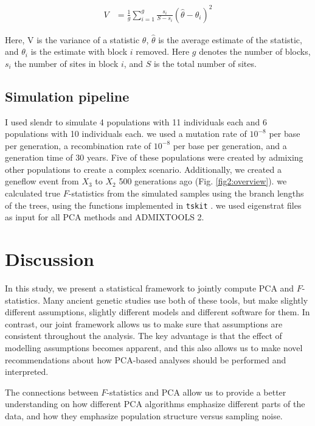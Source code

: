 \documentclass[12pt]{article}
\begin{document}
\begin{align}\label{eq:bjk_var}
V &= \frac{1}{g} \sum_{i=1}^g \frac{s_i}{S-s_i} (\hat{\theta} - \theta_i)^2
\end{align}

Here, V is the variance of a statistic $\theta$, $\hat{\theta}$ is the average estimate of the statistic, and $\theta_i$ is the estimate with block $i$ removed. Here $g$ denotes the number of blocks, $s_i$ the number of sites in block $i$, and $S$ is the total number of sites.

\subsection{Simulation pipeline}

I used slendr \citep{petr_slendr_2022} to simulate 4 populations with 11 individuals each and 6 populations with 10 individuals each. we used a mutation rate of $10^{-8}$ per base per generation, a recombination rate of $10^{-8}$ per base per generation, and a generation time of 30 years. Five of these populations were created by admixing other populations to create a complex scenario. Additionally, we created a geneflow event from $X_3$ to $X_2$ 500 generations ago (Fig. \ref{fig2:overview}). we calculated true $F$-statistics from the simulated samples using the branch lengths of the trees, using the functions implemented in \texttt{tskit} \citep{baumdicker_efficient_2022}. we used eigenstrat files as input for all PCA methods and ADMIXTOOLS 2. 

\section{Discussion}
In this study, we present a statistical framework to jointly compute PCA and $F$-statistics. Many ancient genetic studies use both of these tools, but make slightly different assumptions, slightly different models and different software for them. In contrast, our joint framework allows us to make sure that assumptions are consistent throughout the analysis. The key advantage is that the effect of modelling assumptions becomes apparent, and this also allows us to make novel recommendations about how PCA-based analyses should be performed and interpreted.

The connections between $F$-statistics and PCA allow us to provide a better understanding on how different PCA algorithms emphasize different parts of the data, and how they emphasize population structure versus sampling noise.
\end{document}
